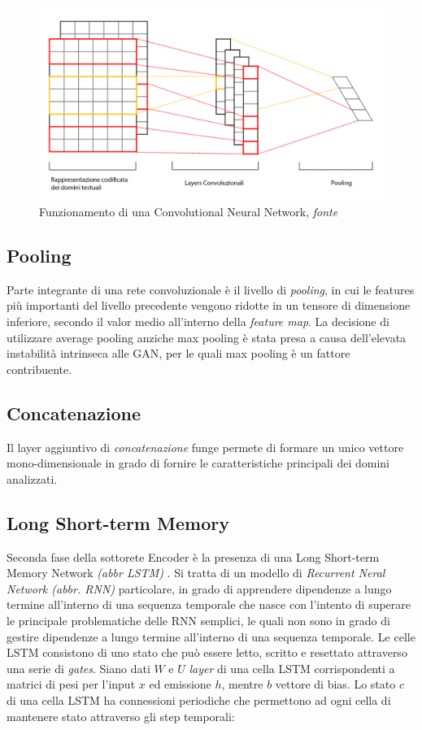 \begin{figure}[!htb]
    \centering
	\includegraphics[width=\columnwidth]{figures/CNN.png}
	\caption{Funzionamento di una Convolutional Neural Network,\textit{ fonte} \cite{fig:cnnfonte} }
\label{fig:cnn}
\end{figure}


\subsection{Pooling}
Parte integrante di una rete convoluzionale è il livello di \textit{pooling}, in cui le features più importanti del livello precedente vengono ridotte in un tensore di dimensione inferiore, secondo il valor medio all'interno della \textit{feature map}. La decisione di utilizzare average pooling anziche max pooling è stata presa a causa dell'elevata instabilità intrinseca alle GAN, per le quali max pooling è un fattore contribuente. 

\subsection{Concatenazione}
Il layer aggiuntivo di \textit{concatenazione} funge permete di formare un unico vettore mono-dimensionale in grado di fornire le caratteristiche principali dei domini analizzati.

\subsection{Long Short-term Memory}
Seconda fase della sottorete Encoder è la presenza di una Long Short-term Memory Network \textit{(abbr LSTM)} \cite{LSTM}. Si tratta di un modello di \textit{Recurrent Neral Network (abbr. RNN)} particolare, in grado di apprendere dipendenze a lungo termine all'interno di una sequenza temporale che nasce con l'intento di superare le principale problematiche delle RNN semplici, le quali non sono in grado di gestire dipendenze a lungo termine all'interno di una sequenza temporale. Le celle LSTM consistono di uno stato che può essere letto, scritto e resettato attraverso una serie di \textit{gates}. Siano dati $W$ e $U$ \textit{layer} di una cella LSTM corrispondenti a matrici di pesi per l'input $x$ ed emissione $h$, mentre $b$ vettore di bias. Lo stato $c$ di una cella LSTM ha connessioni periodiche che permettono ad ogni cella di mantenere stato attraverso gli step temporali:

